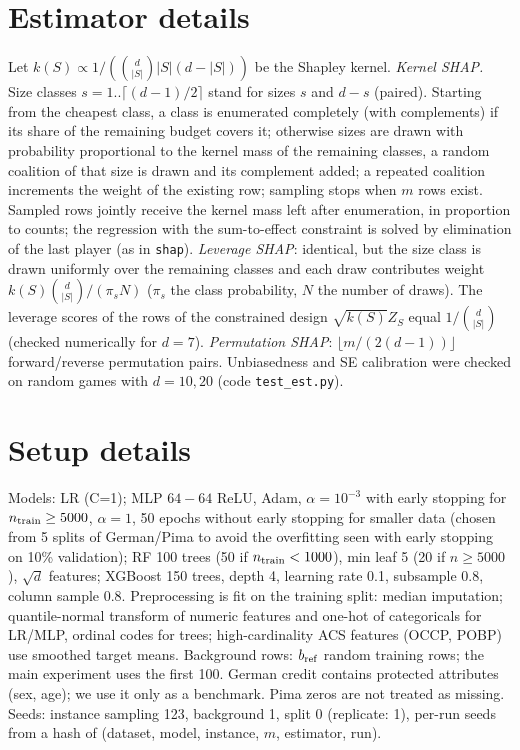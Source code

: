 \documentclass{article}
\begin{document}
\section{Estimator details}\label{app:est}
Let $k(S)\propto 1/(\binom{d}{|S|}|S|(d-|S|))$ be the Shapley kernel. \emph{Kernel SHAP.} Size classes $s=1..\lceil (d-1)/2\rceil$ stand for sizes $s$ and $d-s$ (paired). Starting from the cheapest class, a class is enumerated completely (with complements) if its share of the remaining budget covers it; otherwise sizes are drawn with probability proportional to the kernel mass of the remaining classes, a random coalition of that size is drawn and its complement added; a repeated coalition increments the weight of the existing row; sampling stops when $m$ rows exist. Sampled rows jointly receive the kernel mass left after enumeration, in proportion to counts; the regression with the sum-to-effect constraint is solved by elimination of the last player (as in \texttt{shap}). \emph{Leverage SHAP}: identical, but the size class is drawn uniformly over the remaining classes and each draw contributes weight $k(S)\binom{d}{|S|}/(\pi_s N)$ ($\pi_s$ the class probability, $N$ the number of draws). The leverage scores of the rows of the constrained design $\sqrt{k(S)}Z_S$ equal $1/\binom{d}{|S|}$ (checked numerically for $d=7$). \emph{Permutation SHAP}: $\lfloor m/(2(d-1))\rfloor$ forward/reverse permutation pairs. Unbiasedness and SE calibration were checked on random games with $d=10,20$ (code \texttt{test\_est.py}).

\section{Setup details}\label{app:setup}
Models: LR (C=1); MLP $64{-}64$ ReLU, Adam, $\alpha=10^{-3}$ with early stopping for $n_{\rm train}\ge5000$, $\alpha=1$, 50 epochs without early stopping for smaller data (chosen from 5 splits of German/Pima to avoid the overfitting seen with early stopping on 10\% validation); RF 100 trees (50 if $n_{\rm train}<1000$), min leaf 5 (20 if $n\ge5000$), $\sqrt d$ features; XGBoost 150 trees, depth 4, learning rate 0.1, subsample 0.8, column sample 0.8. Preprocessing is fit on the training split: median imputation; quantile-normal transform of numeric features and one-hot of categoricals for LR/MLP, ordinal codes for trees; high-cardinality ACS features (OCCP, POBP) use smoothed target means. Background rows: $b_{\rm ref}$ random training rows; the main experiment uses the first 100. German credit contains protected attributes (sex, age); we use it only as a benchmark. Pima zeros are not treated as missing. Seeds: instance sampling 123, background 1, split 0 (replicate: 1), per-run seeds from a hash of (dataset, model, instance, $m$, estimator, run).
\end{document}
